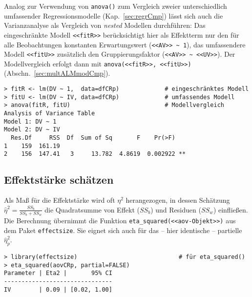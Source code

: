 Analog zur Verwendung von \lstinline!anova()! zum Vergleich zweier unterschiedlich umfassender Regressionsmodelle (Kap.\ \ref{sec:regrCmp}) lässt sich auch die Varianzanalyse als Vergleich von \emph{nested} Modellen durchführen: Das eingeschränkte Modell \lstinline!<<fitR>>! berücksichtigt hier als Effektterm nur den für alle Beobachtungen konstanten Erwartungswert (\lstinline!<<AV>> ~ 1!), das umfassendere Modell \lstinline!<<fitU>>! zusätzlich den Gruppierungsfaktor (\lstinline!<<AV>> ~ <<UV>>!). Der Modellvergleich erfolgt dann mit \lstinline!anova(<<fitR>>, <<fitU>>)! (Abschn.\ \ref{sec:multALMmodCmp}).
\begin{lstlisting}
> fitR <- lm(DV ~ 1,  data=dfCRp)             # eingeschränktes Modell
> fitU <- lm(DV ~ IV, data=dfCRp)             # umfassendes Modell
> anova(fitR, fitU)                           # Modellvergleich
Analysis of Variance Table
Model 1: DV ~ 1
Model 2: DV ~ IV
  Res.Df     RSS  Df  Sum of Sq       F    Pr(>F)
1    159  161.19
2    156  147.41   3     13.782  4.8619  0.002922 **
\end{lstlisting}

\subsection{Effektstärke schätzen}
\label{sec:CRpEff}

Als Maß für die Effektstärke wird oft $\eta^{2}$ herangezogen, in dessen Schätzung $\hat{\eta}^{2} = \frac{SS_{b}}{SS_{b} + SS_{w}}$ die Quadratsumme von Effekt ($SS_{b}$) und Residuen ($SS_{w}$) einfließen. Die Berechnung übernimmt die Funktion \lstinline!eta_squared(<<aov-Objekt>>)! aus dem Paket \lstinline!effectsize!. Sie eignet sich auch für das -- hier identische -- partielle $\hat{\eta}^{2}_{p}$.
\begin{lstlisting}
> library(effectsize)                             # für eta_squared()
> eta_squared(aovCRp, partial=FALSE)
Parameter | Eta2 |       95% CI
-------------------------------
IV        | 0.09 | [0.02, 1.00]
\end{lstlisting}

